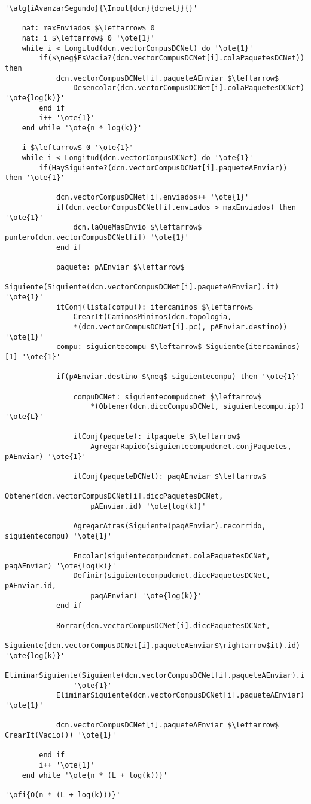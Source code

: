 \begin{lstlisting}[mathescape]
'\alg{iAvanzarSegundo}{\Inout{dcn}{dcnet}}{}'

	nat: maxEnviados $\leftarrow$ 0
	nat: i $\leftarrow$ 0 '\ote{1}'
	while i < Longitud(dcn.vectorCompusDCNet) do '\ote{1}'
		if($\neg$EsVacia?(dcn.vectorCompusDCNet[i].colaPaquetesDCNet)) then
			dcn.vectorCompusDCNet[i].paqueteAEnviar $\leftarrow$ 
				Desencolar(dcn.vectorCompusDCNet[i].colaPaquetesDCNet) '\ote{log(k)}'
		end if
		i++ '\ote{1}'
	end while '\ote{n * log(k)}'

	i $\leftarrow$ 0 '\ote{1}'
	while i < Longitud(dcn.vectorCompusDCNet) do '\ote{1}'
		if(HaySiguiente?(dcn.vectorCompusDCNet[i].paqueteAEnviar)) then '\ote{1}'

			dcn.vectorCompusDCNet[i].enviados++ '\ote{1}'
			if(dcn.vectorCompusDCNet[i].enviados > maxEnviados) then '\ote{1}'
				dcn.laQueMasEnvio $\leftarrow$ puntero(dcn.vectorCompusDCNet[i]) '\ote{1}'
			end if

			paquete: pAEnviar $\leftarrow$ 
				Siguiente(Siguiente(dcn.vectorCompusDCNet[i].paqueteAEnviar).it) '\ote{1}'
			itConj(lista(compu)): itercaminos $\leftarrow$ 
				CrearIt(CaminosMinimos(dcn.topologia, 
				*(dcn.vectorCompusDCNet[i].pc), pAEnviar.destino)) '\ote{1}'
			compu: siguientecompu $\leftarrow$ Siguiente(itercaminos)[1] '\ote{1}'

			if(pAEnviar.destino $\neq$ siguientecompu) then '\ote{1}'

				compuDCNet: siguientecompudcnet $\leftarrow$ 
					*(Obtener(dcn.diccCompusDCNet, siguientecompu.ip)) '\ote{L}'
				
				itConj(paquete): itpaquete $\leftarrow$ 
					AgregarRapido(siguientecompudcnet.conjPaquetes, pAEnviar) '\ote{1}'

				itConj(paqueteDCNet): paqAEnviar $\leftarrow$ 
					Obtener(dcn.vectorCompusDCNet[i].diccPaquetesDCNet, 
					pAEnviar.id) '\ote{log(k)}'
				
				AgregarAtras(Siguiente(paqAEnviar).recorrido, siguientecompu) '\ote{1}'

				Encolar(siguientecompudcnet.colaPaquetesDCNet, paqAEnviar) '\ote{log(k)}'
				Definir(siguientecompudcnet.diccPaquetesDCNet, pAEnviar.id,
					paqAEnviar) '\ote{log(k)}'
			end if
			
			Borrar(dcn.vectorCompusDCNet[i].diccPaquetesDCNet,
				Siguiente(dcn.vectorCompusDCNet[i].paqueteAEnviar$\rightarrow$it).id) '\ote{log(k)}'
			EliminarSiguiente(Siguiente(dcn.vectorCompusDCNet[i].paqueteAEnviar).it) 
				'\ote{1}'
			EliminarSiguiente(dcn.vectorCompusDCNet[i].paqueteAEnviar) '\ote{1}'

			dcn.vectorCompusDCNet[i].paqueteAEnviar $\leftarrow$ CrearIt(Vacio()) '\ote{1}'

		end if
		i++ '\ote{1}'
	end while '\ote{n * (L + log(k))}'	

'\ofi{O(n * (L + log(k)))}'
\end{lstlisting}

